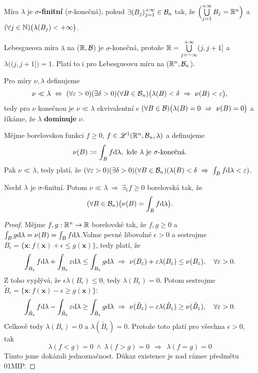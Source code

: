 \begin{define}
	Míra $\lambda$ je \textbf{$\sigma$-finitní} ($\sigma$-konečná), pokud $\exists(B_j)_{j=1}^{+\infty} \in \mathcal{B}_n$ tak, že $\Bigl(\bigcup\limits_{j=1}^{+\infty} B_j = \mathbb{R}^n \Bigr)$ a $(\forall j\in\mathbb{N})\bigl(\lambda(B_j)<+\infty\bigr)$.
\end{define}
\begin{remark}
	 Lebesgueova míra $\lambda$ na ($\mathbb{R},\mathcal{B}$) je $\sigma$-konečná, protože $\mathbb{R}=\bigcup\limits_{j=-\infty}^{+\infty}(j,j+1]$ a $\lambda\bigl((j,j+1]\bigr)=1$. Platí to i pro Lebesgueovu míru na ($\mathbb{R}^n,\mathcal{B}_n$).	
\end{remark}
\begin{define}\label{trhladefka}Pro míry $\nu,\lambda$ definujeme
	$$\nu\ll\lambda~\Leftrightarrow~(\forall \varepsilon>0)(\exists \delta>0)(\forall B \in\mathcal{B}_n)\bigl(\lambda(B)<\delta~\Rightarrow~\nu(B)<\varepsilon\bigr),$$ tedy pro $\nu$ konečnou je $\nu\ll \lambda$ ekvivalentní s $(\forall B \in\mathcal{B})\bigl(\lambda(B)=0 ~\Rightarrow~ \nu(B)=0\bigr)$ a říkáme, že $\lambda$ \textbf{dominuje} $\nu$.
\end{define}
\begin{theorem}
	Mějme borelovskou funkci $f\geq0$, $f\in\mathscr{L}^1(\mathbb{R}^n,\mathcal{B}_n,\lambda)$ a definujeme $$\nu(B):=\int_B f \mathrm{d}\lambda,\text{ kde }\lambda\text{ je }\sigma\text{-konečná}. $$
	Pak $\nu\ll \lambda$, tedy platí, že $(\forall \varepsilon>0)(\exists \delta>0)(\forall B\in\mathcal{B}_n)(\lambda(B)<\delta ~\Rightarrow~ \int_B f \mathrm{d}\lambda < \varepsilon)$.
\end{theorem}
\begin{dusl}[spojení]
	Nechť $\lambda$ je $\sigma$-finitní. Potom $\nu\ll \lambda~\Rightarrow~\exists_1  f\geq 0$ borelovská tak, že $$(\forall B\in\mathcal{B}_n)\bigl(\nu(B)=\int_B f \mathrm{d}\lambda\bigr).$$
	\begin{proof}
			Mějme  $f,g:\mathbb{R}^n\to\mathbb{R}$ borelovské tak, že $f,g \geq 0$ a $\int_B g \mathrm{d}\lambda = \nu(B)=\int_B f \mathrm{d}\lambda$.\newline Volme pevné libovolné $\epsilon>0$ a sestrojme $B_\epsilon=\{ \textbf{x}:f(\textbf{x})+\epsilon\leq g(\textbf{x}) \}$, tedy platí, že
		$$ \int_{B_\varepsilon} f\mathrm{d}\lambda + \int_{B_\varepsilon}  \varepsilon \mathrm{d}\lambda \leq \int_{B_\varepsilon}  g \mathrm{d}\lambda ~\Rightarrow~ \nu(B_\varepsilon)+\varepsilon\lambda(B_\varepsilon)\leq \nu(B_\varepsilon), ~~~\forall \varepsilon>0.$$
		Z toho vyplývá, že $\epsilon\lambda(B_\epsilon)\leq 0$, tedy $\lambda(B_\epsilon)=0$. Potom sestrojme $\tilde{B}_\epsilon=\{ \textbf{x}:f(\textbf{x})-\epsilon\geq g(\textbf{x}) \}$:
		$$ \int_{\tilde{B}_\varepsilon} f\mathrm{d}\lambda - \int_{\tilde{B}_\varepsilon}  \varepsilon \mathrm{d}\lambda \geq \int_{\tilde{B}_\varepsilon}  g \mathrm{d}\lambda ~\Rightarrow~ \nu(\tilde{B}_\varepsilon)-\varepsilon\lambda(\tilde{B}_\varepsilon)\geq \nu(\tilde{B}_\varepsilon), ~~~\forall \varepsilon>0.$$
		Celkově tedy $\lambda(B_\epsilon)=0$ a $\lambda(\tilde{B_\epsilon})=0$. Protože toto platí pro všechna $\epsilon>0$, tak
		$$ \lambda(f<g)=0 ~\wedge ~\lambda(f>g)=0 ~~\Rightarrow~ ~\lambda(f=g)=0 $$
		Tímto jsme dokázali jednoznačnost. Důkaz existence je nad rámec předmětu 01MIP.
	\end{proof}
\end{dusl}
